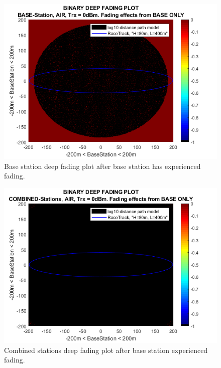 \begin{figure}[H]
	\centering
	\includegraphics[width=\linewidth]{theory/fading/fig/binaryDeepFading_baseStation_baseOnly.png}
	\caption{Base station deep fading plot after base station has experienced fading.}
	\label{fig:binaryDeepFading_baseStation_baseOnly}
\end{figure}

\begin{figure}[H]
	\centering
	\includegraphics[width=\linewidth]{theory/fading/fig/binaryDeepFading_combinedStations_baseOnly.png}
	\caption{Combined stations deep fading plot after base station experienced fading.}
	\label{fig:binaryDeepFading_combinedStations_baseOnly}
\end{figure}

